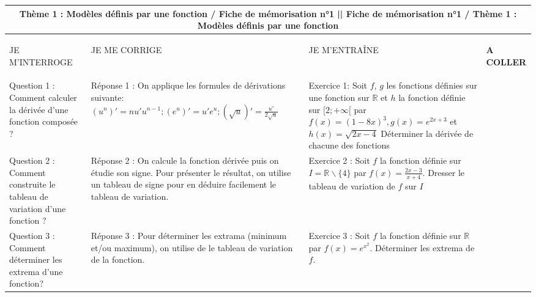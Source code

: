 \documentclass[10pt,a4paper,landscape]{article}
\begin{document}
		\begin{tabular}{|p{6.5cm}|p{6.5cm}||p{6.5cm}|p{6.5cm}|}
			\hline
			\multicolumn{4}{|c|}{Thème 1 : Modèles définis par une fonction / Fiche de mémorisation n°1 || Fiche de mémorisation n°1 / Thème 1 : Modèles définis par une fonction}\\
			\hline
			\begin{center}\uppercase{je m'interroge}\end{center}&
			\begin{center}\uppercase{je me corrige}\end{center}&
			\begin{center}\uppercase{je m'entraîne}\end{center}& 
			\begin{center}\textbf{A COLLER}\cellcolor{gray!25}\end{center} \\
			\hline
			Question 1 :
			Comment calculer la dérivée d'une fonction composée ? &
			Réponse 1 :
			On applique les formules de dérivations suivante: $(u^n)'=nu'u^{n-1} ; (e^u)'=u'e^u ; (\sqrt{u})'= \frac{u'}{2\sqrt{u}}$ &
			Exercice 1: Soit $f$, $g$ les fonctions définies sur  une fonction sur $\mathbb{R}$ et $h$ la fonction définie sur $[2 ; +\infty[$ par $f(x)=(1-8x)^3 , g(x)=e^{2x+3}$ et $h(x)=\sqrt{2x-4}$ Déterminer la dérivée de chacune des fonctions &
			\cellcolor{gray!25} \\
			\hline
			
			Question 2 : Comment construite le tableau de variation d'une fonction ? &
			Réponse 2 : On calcule  la fonction dérivée puis on étudie son signe. Pour présenter le résultat, on utilise un tableau de signe pour en déduire facilement le tableau de variation. &
			Exercice 2 : Soit $f$ la fonction définie sur $I= \mathbb{R} \backslash \lbrace4\rbrace$ par $f(x)=\frac{2x-3}{x+4}$. Dresser le tableau de variation de $f$ sur $I$ & 
			\cellcolor{gray!25}\\
			\hline
			
			Question 3 : Comment déterminer les extrema d'une fonction? &
			Réponse 3 : Pour déterminer les extrama (minimum et/ou maximum), on utilise de le tableau de variation de la fonction. &
			Exercice 3 : Soit $f$ la fonction définie sur $\mathbb{R}$ par $f(x)=e^{x^2}$. Déterminer les extrema de $f$. &
			\cellcolor{gray!25}\\
			\hline
			

\end{tabular}
\end{document}
